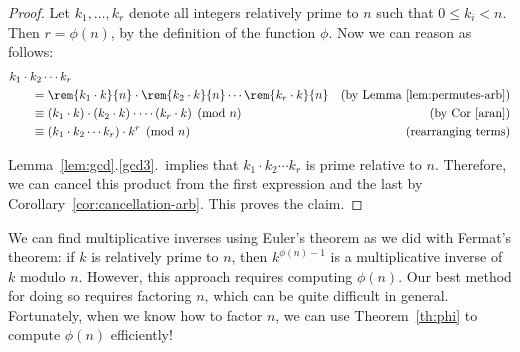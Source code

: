 \begin{proof}
Let $k_1, \dots, k_r$ denote all integers relatively prime to $n$
such that $0 \leq k_i < n$.  Then $r = \phi(n)$, by the definition of
the function $\phi$.  Now we can reason as follows:
%
\begin{align*}
\lefteqn{k_1 \cdot k_2 \cdots k_r} \hspace{0.25in} \\
& =
\rem{k_1 \cdot k}{n} \cdot 
\rem{k_2 \cdot k}{n} \cdots 
\rem{k_r \cdot k}{n} & \text{(by Lemma~\ref{lem:permutes-arb})}
\\
& \equiv 
(k_1 \cdot k) \cdot 
(k_2 \cdot k) \cdot 
\cdots 
(k_r \cdot k) \pmod{n} & \text{(by Cor~\ref{aran})}
\\
& \equiv  
(k_1 \cdot k_2 \cdots k_r) \cdot k^r \pmod{n} & \text{(rearranging terms)}
\end{align*}

Lemma~\ref{lem:gcd}.\ref{gcd3}.\ implies that $k_1 \cdot k_2
\cdots k_r$ is prime relative to $n$.  Therefore, we can cancel this
product from the first expression and the last by
Corollary~\ref{cor:cancellation-arb}.  This proves the claim.
\end{proof}

We can find multiplicative inverses using Euler's theorem as we did
with Fermat's theorem: if $k$ is relatively prime to $n$, then
$k^{\phi(n) - 1}$ is a multiplicative inverse of $k$ modulo $n$.
However, this approach requires computing $\phi(n)$.  Our best method
for doing so requires factoring $n$, which can be quite difficult in
general.  Fortunately, when we know how to factor $n$, we can
use Theorem~\ref{th:phi} to compute $\phi(n)$ efficiently!

